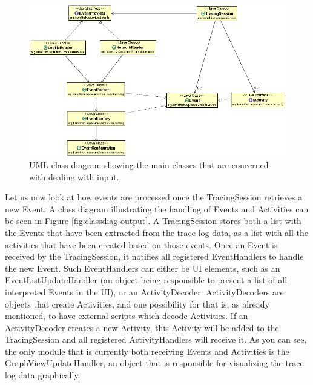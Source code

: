 \documentclass[a4paper,11pt,twoside]{report}
\begin{document}
\begin{figure}[htb]
	\includegraphics[width=1\textwidth]{images/classdiag-input.png}
	\caption{UML class diagram showing the main classes that are concerned with
		dealing with input.}
	\label{fig:classdiag-input}
\end{figure}

Let us now look at how events are processed once the TracingSession retrieves a new Event.
A class diagram illustrating the handling of Events and Activities can be seen
in Figure \ref{fig:classdiag-output}. A TracingSession stores both a list with
the Events that have been extracted from the trace log data, as a list with all
the activities that have been created based on those events. Once an Event is
received by the TracingSession, it notifies all registered EventHandlers to
handle the new Event. Such EventHandlers can either be UI elements, such as an
EventListUpdateHandler (an object being responsible to present a list of all
interpreted Events in the UI), or an ActivityDecoder. ActivityDecoders are
objects that create Activities, and one possibility for that is, as already
mentioned, to have external scripts which decode Activities. If an
ActivityDecoder creates a new Activity, this Activity will be added to the
TracingSession and all registered ActivityHandlers will receive it. As you can
see, the only module that is currently both receiving Events and Activities is
the GraphViewUpdateHandler, an object that is responsible for visualizing the
trace log data graphically.
\end{document}
